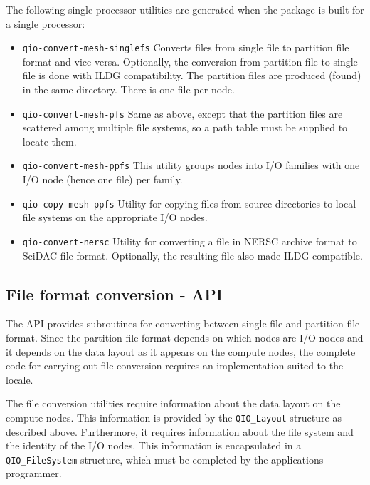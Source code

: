 \documentclass{article}
\begin{document}
The following single-processor utilities are generated when the
package is built for a single processor:

\begin{itemize}
  \item \verb|qio-convert-mesh-singlefs| Converts files from single file 
        to partition file format and vice versa.  Optionally, the
        conversion from partition file to single file is done with
        ILDG compatibility.  The partition files are produced (found)
        in the same directory.  There is one file per node.
  \item \verb|qio-convert-mesh-pfs| Same as above, except that the 
        partition files are scattered among multiple file systems,
        so a path table must be supplied to locate them.
  \item \verb|qio-convert-mesh-ppfs| This utility groups nodes into 
        I/O families with one I/O node (hence one file) per family.
  \item \verb|qio-copy-mesh-ppfs| Utility for copying files from
        source directories to local file systems on the appropriate
        I/O nodes.
  \item \verb|qio-convert-nersc| Utility for converting a file in 
        NERSC archive format to SciDAC file format.  Optionally, the
        resulting file also made ILDG compatible.
\end{itemize}

\subsection{File format conversion - API}

The API provides subroutines for converting between single file and
partition file format.  Since the partition file format depends on
which nodes are I/O nodes and it depends on the data layout as it
appears on the compute nodes, the complete code for carrying out file
conversion requires an implementation suited to the locale.

The file conversion utilities require information about the data
layout on the compute nodes.  This information is provided by the
\verb|QIO_Layout| structure as described above.  Furthermore, it
requires information about the file system and the identity of the I/O
nodes.  This information is encapsulated in a \verb|QIO_FileSystem|
structure, which must be completed by the applications programmer.
\end{document}
